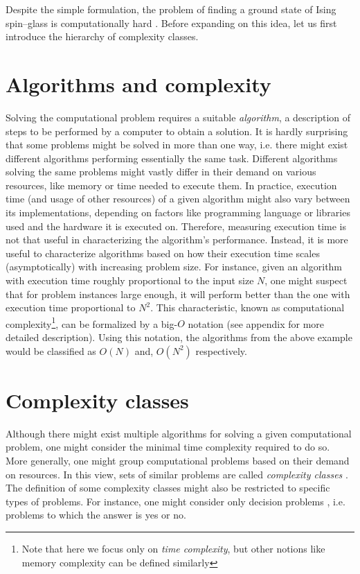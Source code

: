 Despite the simple formulation, the problem of finding a ground state of Ising spin--glass is
computationally hard \cite{barahoma}. Before expanding on this idea, let us first introduce the
hierarchy of complexity classes.

\section{Algorithms and complexity}


Solving the computational problem requires a suitable \emph{algorithm}, a description of steps to be
performed by a computer to obtain a solution. It is hardly surprising that some problems might be
solved in more than one way, i.e. there might exist different algorithms performing essentially the
same task. Different algorithms solving the same problems might vastly differ in their demand on
various resources, like memory or time needed to execute them. In practice, execution time (and
usage of other resources) of a given algorithm might also vary between its implementations,
depending on factors like programming language or libraries used and the hardware it is executed on.
Therefore, measuring execution time is not that useful in characterizing the algorithm's
performance.  Instead, it is more useful to characterize algorithms based on how their execution
time scales (asymptotically) with increasing problem size\cite{arora}. For instance, given an
algorithm with execution time roughly proportional to the input size $N$, one might suspect that for
problem instances large enough, it will perform better than the one with execution time proportional
to $N^{2}$. This characteristic, known as computational complexity\footnote{Note that here we focus
only on \emph{time complexity}, but other notions like memory complexity can be defined similarly},
can be formalized by a big-$O$ notation (see appendix for more detailed description). Using this
notation, the algorithms from the above example would be classified as $O(N)$ and, $O(N^{2})$
respectively.

\section{Complexity classes}
Although there might exist multiple algorithms for solving a given computational problem, one might
consider the minimal time complexity required to do so. More generally, one might group
computational problems based on their demand on resources. In this view, sets of similar problems
are called \emph{complexity classes} \cite{arora}. The definition of some complexity classes might
also be restricted to specific types of problems. For instance, one might consider only decision
problems \cite{arora}, i.e. problems to which the answer is yes or no.

